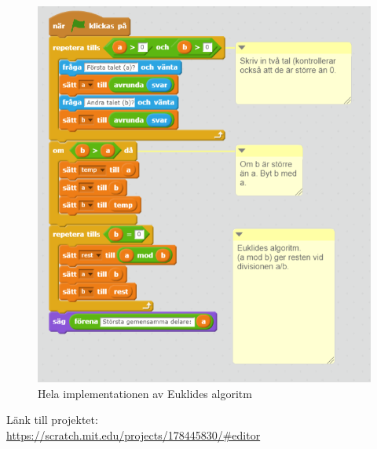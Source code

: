 \documentclass[12pt,a4paper]{article}
\begin{document}
\begin{figure}[H]
	\label{fig:euk}
	\caption{Hela implementationen av Euklides algoritm}
	\includegraphics[scale=0.7]{euklidesimpl}
\end{figure}

Länk till projektet:  \\
 \url{https://scratch.mit.edu/projects/178445830/#editor }
\end{document}
